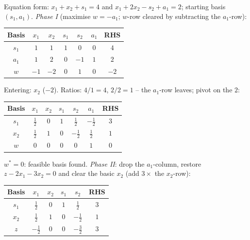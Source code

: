 \begin{solutions}
  \item Equation form: $x_{1}+x_{2}+s_{1}=4$ and
        $x_{1}+2x_{2}-s_{2}+a_{1}=2$; starting basis $(s_{1},a_{1})$.
        \emph{Phase I} (maximise $w=-a_{1}$; $w$-row cleared by
        subtracting the $a_{1}$-row):
        \begin{center}
        \begin{tabular}{c|ccccc|c}
        Basis & $x_{1}$ & $x_{2}$ & $s_{1}$ & $s_{2}$ & $a_{1}$ & RHS\\
        \hline
        $s_{1}$ & $1$ & $1$ & $1$ & $0$ & $0$ & $4$\\
        $a_{1}$ & $1$ & $2$ & $0$ & $-1$ & $1$ & $2$\\
        \hline
        $w$ & $-1$ & $-2$ & $0$ & $1$ & $0$ & $-2$\\
        \end{tabular}
        \end{center}
        Entering: $x_{2}$ ($-2$). Ratios: $4/1=4$, $2/2=1$ -- the
        $a_{1}$-row leaves; pivot on the $2$:
        \begin{center}
        \begin{tabular}{c|ccccc|c}
        Basis & $x_{1}$ & $x_{2}$ & $s_{1}$ & $s_{2}$ & $a_{1}$ & RHS\\
        \hline
        $s_{1}$ & $\tfrac{1}{2}$ & $0$ & $1$ & $\tfrac{1}{2}$
                & $-\tfrac{1}{2}$ & $3$\\
        $x_{2}$ & $\tfrac{1}{2}$ & $1$ & $0$ & $-\tfrac{1}{2}$
                & $\tfrac{1}{2}$ & $1$\\
        \hline
        $w$ & $0$ & $0$ & $0$ & $0$ & $1$ & $0$\\
        \end{tabular}
        \end{center}
        $w^{*}=0$: feasible basis found. \emph{Phase II}: drop the
        $a_{1}$-column, restore $z-2x_{1}-3x_{2}=0$ and clear the basic
        $x_{2}$ (add $3\times$ the $x_{2}$-row):
        \begin{center}
        \begin{tabular}{c|cccc|c}
        Basis & $x_{1}$ & $x_{2}$ & $s_{1}$ & $s_{2}$ & RHS\\
        \hline
        $s_{1}$ & $\tfrac{1}{2}$ & $0$ & $1$ & $\tfrac{1}{2}$ & $3$\\
        $x_{2}$ & $\tfrac{1}{2}$ & $1$ & $0$ & $-\tfrac{1}{2}$ & $1$\\
        \hline
        $z$ & $-\tfrac{1}{2}$ & $0$ & $0$ & $-\tfrac{3}{2}$ & $3$\\

\end{tabular}
\end{center}
\end{solutions}
